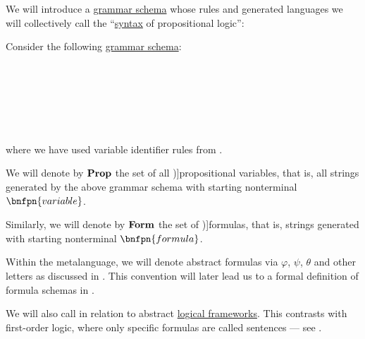 \begin{definition}\label{def:propositional_syntax}\mimprovised
  We will introduce a \hyperref[def:formal_grammar/schema]{grammar schema} whose rules and generated languages we will collectively call the \enquote{\hyperref[con:syntax_and_semantics]{syntax} of propositional logic}:
  \begin{thmenum}
     Consider the following \hyperref[def:formal_grammar/schema]{grammar schema}:
    \begin{bnf*}
          {} \\
        {\bnftsq{\( \synvee \)} \bnfor \bnftsq{\( \synwedge \)} \bnfor \bnftsq{\( \synimplies \)}\bnfor \bnftsq{\( \syniff \)}} \\
           {\bnftsq{\( \syntop \)} \bnfor \bnftsq{\( \synbot \)} \bnfor} \\
       \\
       \\
    \end{bnf*}
    where we have used variable identifier rules from .

     We will denote by \( \op*{Prop} \) the set of all \term[ru=пропозициональные переменные (\cite[43]{КолмогоровДрагалин2006})]{propositional variables}, that is, all strings generated by the above grammar schema with starting nonterminal \( \bnfpn{variable} \).

     Similarly, we will denote by \( \op*{Form} \) the set of \term[ru=формула (\cite[43]{КолмогоровДрагалин2006})]{formulas}, that is, strings generated with starting nonterminal \( \bnfpn{formula} \).

    Within the metalanguage, we will denote abstract formulas via \( \varphi \), \( \psi \), \( \theta \) and other letters as discussed in . This convention will later lead us to a formal definition of formula schemas in .

    We will also call  in relation to abstract \hyperref[def:logical_framework]{logical frameworks}. This contrasts with first-order logic, where only specific formulas are called sentences --- see .


\end{thmenum}
\end{definition}
